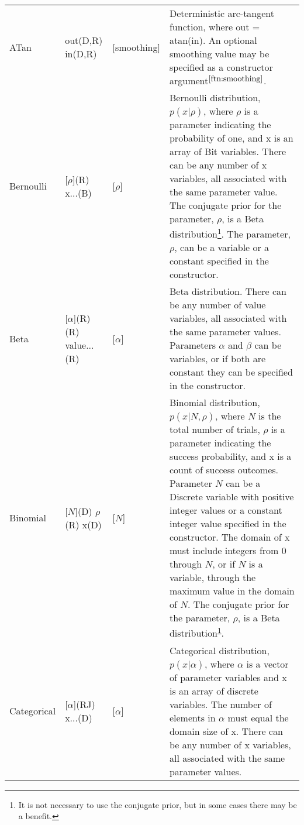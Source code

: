 \begin{longtable} {p{3.5cm} p{2.2cm} p{2cm} p{7cm}}
%
ATan & out(D,R) \newline in(D,R) & [smoothing] & Deterministic arc-tangent function, where out = atan(in). An optional smoothing value may be specified as a constructor argument$^{\ref{ftn:smoothing}}$. \\
%
Bernoulli & [$\rho$](R) \newline x...(B) & [$\rho$] & Bernoulli distribution, $p(x|\rho)$, where $\rho$ is a parameter indicating the probability of one, and x is an array of Bit variables.  There can be any number of x variables, all associated with the same parameter value. The conjugate prior for the parameter, $\rho$, is a Beta distribution\footnote{\label{ftn:conjugatePrior}It is not necessary to use the conjugate prior, but in some cases there may be a benefit.}. The parameter, $\rho$, can be a variable or a constant specified in the constructor.\\
%
Beta & [$\alpha$](R) \newline [$\beta$](R) \newline value...(R) & [$\alpha$] \newline [$\beta$] & Beta distribution. There can be any number of value variables, all associated with the same parameter values.  Parameters $\alpha$ and $\beta$ can be variables, or if both are constant they can be specified in the constructor. \\
%
Binomial & [$N$](D) \newline $\rho$(R) \newline x(D) & [$N$] & Binomial distribution, $p(x|N, \rho)$, where $N$ is the total number of trials, $\rho$ is a parameter indicating the success probability, and x is a count of success outcomes.  Parameter $N$ can be a Discrete variable with positive integer values or a constant integer value specified in the constructor.  The domain of x must include integers from 0 through $N$, or if $N$ is a variable, through the maximum value in the domain of $N$.  The conjugate prior for the parameter, $\rho$, is a Beta distribution\textsuperscript{\ref{ftn:conjugatePrior}}. \\
%
Categorical & [$\alpha$](RJ)  \newline x...(D) & [$\alpha$] & Categorical distribution, $p(x | \alpha)$, where $\alpha$ is a vector of parameter variables and x is an array of discrete variables.  The number of elements in $\alpha$ must equal the domain size of x.  There can be any number of x variables, all associated with the same parameter values.  \newline

\end{longtable}
